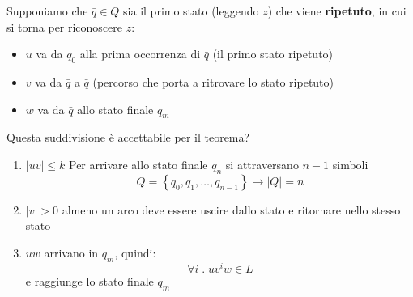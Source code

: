 \documentclass[a4paper]{article}
\begin{document}
\begin{theorem}
  \vspace{1em}
  \noindent
  Supponiamo che \( \bar{q} \in Q \) sia il primo stato (leggendo \( z \)) che viene
  \textbf{ripetuto}, in cui si torna per riconoscere \( z \):
  \begin{figure}[H]
    \centering
    \label{27-10-D1}
  \end{figure}
  \noindent
  \begin{itemize}
    \item \( u \) va da \( q_0 \) alla prima occorrenza di \( \bar{q} \) (il primo
      stato ripetuto)

    \item \( v \) va da \( \bar{q} \) a \( \bar{q} \) (percorso che porta a ritrovare
      lo stato ripetuto)

    \item \( w \) va da \( \bar{q} \) allo stato finale \( q_m \)
  \end{itemize}
  Questa suddivisione è accettabile per il teorema?
  \begin{enumerate}
    \item \( \left| uv \right| \le k \) 
      \label{27-10-D2}
      \noindent
      Per arrivare allo stato finale \( q_n \) si attraversano \( n-1 \) simboli
      \[
        Q = \left\{ q_0, q_1, \ldots, q_{n-1} \right\} \to \left| Q \right| = n
      \] 

    \item \( \left| v \right| > 0 \) almeno un arco deve essere uscire dallo stato
      e ritornare nello stesso stato

    \item \( uw \) arrivano in \( q_m \), quindi:
      \[
        \forall i \;.\; uv^iw \in L
      \] 
      e raggiunge lo stato finale \( q_m \)
  \end{enumerate}
\end{theorem}
\end{document}

